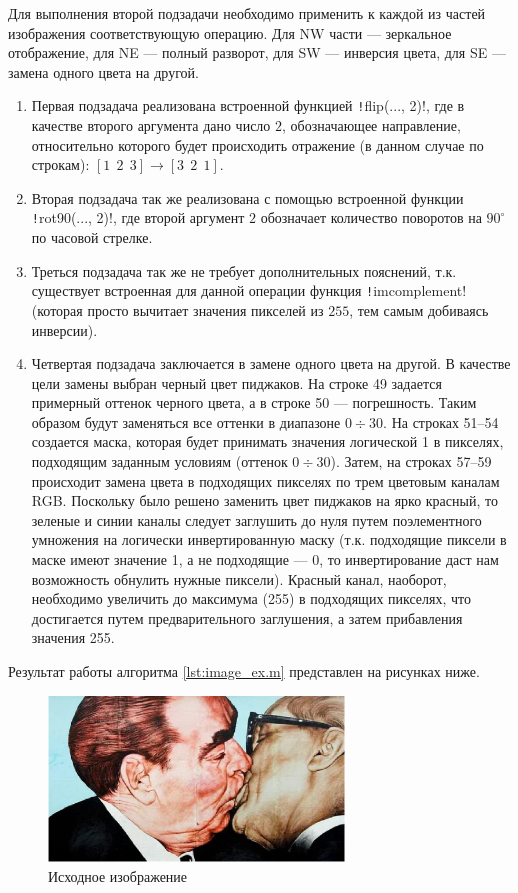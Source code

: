 Для выполнения второй подзадачи необходимо применить к каждой из частей изображения соответствующую операцию.
Для NW части --- зеркальное отображение, для NE --- полный разворот, для SW --- инверсия цвета, для SE --- замена одного цвета на другой.

\begin{enumerate}
    \item Первая подзадача реализована встроенной функцией \texttt!flip(..., 2)!, где в качестве второго аргумента дано число $2$, обозначающее направление, относительно которого будет происходить отражение (в данном случае по строкам): $\left[1~~2~~3\right] \rightarrow \left[ 3~~2~~1 \right]$.
    \item Вторая подзадача так же реализована с помощью встроенной функции \texttt!rot90(..., 2)!, где второй аргумент $2$ обозначает количество поворотов на $90^\circ$ по часовой стрелке.
    \item Треться подзадача так же не требует дополнительных пояснений, т.к. существует встроенная для данной операции функция \texttt!imcomplement! (которая просто вычитает значения пикселей из $255$, тем самым добиваясь инверсии).
    \item Четвертая подзадача заключается в замене одного цвета на другой. В качестве цели замены выбран черный цвет пиджаков. На строке 49 задается примерный оттенок черного цвета, а в строке 50 --- погрешность. Таким образом будут заменяться все оттенки в диапазоне $0 \div 30$. На строках 51--54 создается маска, которая будет принимать значения логической 1 в пикселях, подходящим заданным условиям (оттенок $0 \div 30$). Затем, на строках 57--59 происходит замена цвета в подходящих пикселях по трем цветовым каналам RGB. Поскольку было решено заменить цвет пиджаков на ярко красный, то зеленые и синии каналы следует заглушить до нуля путем поэлементного умножения на логически инвертированную маску (т.к. подходящие пиксели в маске имеют значение 1, а не подходящие --- 0, то инвертирование даст нам возможность обнулить нужные пиксели). Красный канал, наоборот, необходимо увеличить до максимума (255) в подходящих пикселях, что достигается путем предварительного заглушения, а затем прибавления значения 255.
\end{enumerate}

Результат работы алгоритма \cref{lst:image_ex.m} представлен на рисунках ниже.

\begin{figure}[H]
    \centering
    \includegraphics[width=0.7\textwidth]{figs/bre.png}
    \caption{Исходное изображение}
    \label{fig:bre.png}
\end{figure}

